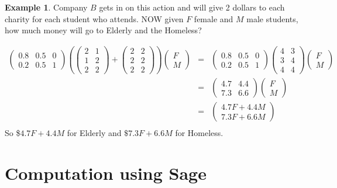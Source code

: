 \documentclass[10pt]{article}
\theoremstyle{definition}
\newtheorem{example}[equation]{Example}
\begin{document}
\begin{example}
Company $B$ gets in on this action and will give 2 dollars to each charity for each student who attends.  NOW given $F$ female and $M$ male students, how much money will go to Elderly and the Homeless?

\begin{eqnarray*}
\begin{pmatrix} 0.8 & 0.5 & 0 \\ 0.2 & 0.5 & 1 \end{pmatrix} \left( \begin{pmatrix} 2 & 1 \\ 1 & 2 \\ 2 & 2\end{pmatrix} + \begin{pmatrix} 2 & 2 \\ 2 & 2 \\ 2 & 2\end{pmatrix}   \right)\begin{pmatrix} F\\M \end{pmatrix}&=&\begin{pmatrix} 0.8 & 0.5 & 0 \\ 0.2 & 0.5 & 1 \end{pmatrix} \begin{pmatrix} 4 & 3 \\ 3 & 4 \\ 4 & 4\end{pmatrix} \begin{pmatrix} F\\M \end{pmatrix}\\
&=&\begin{pmatrix} 4.7 & 4.4 \\ 7.3 &  6.6 \end{pmatrix}\begin{pmatrix} F\\M \end{pmatrix}\\
&=&\begin{pmatrix} 4.7F+4.4M\\ 7.3F+6.6M \end{pmatrix}\\
\end{eqnarray*}
So \$$4.7 F+4.4M$ for Elderly and $\$7.3 F+6.6M$ for Homeless.
\end{example}

\section{Computation using Sage}
\end{document}
